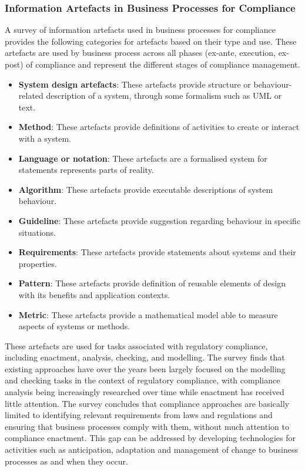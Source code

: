 \subsubsection{Information Artefacts in Business Processes for Compliance}
A survey of information artefacts used in business processes for compliance \cite{benyoucef_information_2015} provides the following categories for artefacts based on their type and use. These artefacts are used by business process across all phases (ex-ante, execution, ex-post) of compliance and represent the different stages of compliance management.
\begin{itemize}
    \item \textbf{System design artefacts}: These artefacts provide structure or behaviour-related description of a system, through some formalism such as UML or text.
    \item \textbf{Method}: These artefacts provide definitions of activities to create or interact with a system.
    \item \textbf{Language or notation}: These artefacts are a formalised system for statements represents parts of reality.
    \item \textbf{Algorithm}: These artefacts provide executable descriptions of system behaviour.
    \item \textbf{Guideline}: These artefacts provide suggestion regarding behaviour in specific situations.
    \item \textbf{Requirements}: These artefacts provide statements about systems and their properties.
    \item \textbf{Pattern}: These artefacts provide definition of reusable elements of design with its benefits and application contexts.
    \item \textbf{Metric}: These artefacts provide a mathematical model able to measure aspects of systems or methods.
\end{itemize}
These artefacts are used for tasks associated with regulatory compliance, including enactment, analysis, checking, and modelling. The survey finds that existing approaches have over the years been largely focused on the modelling and checking tasks in the context of regulatory compliance, with compliance analysis being increasingly researched over time  while enactment has received little attention. The survey concludes that compliance approaches are basically limited to identifying relevant requirements from laws and regulations and ensuring that business processes comply with them, without much attention to compliance enactment.
This gap can be addressed by developing technologies for activities such as anticipation, adaptation and management of change to business processes as and when they occur.

